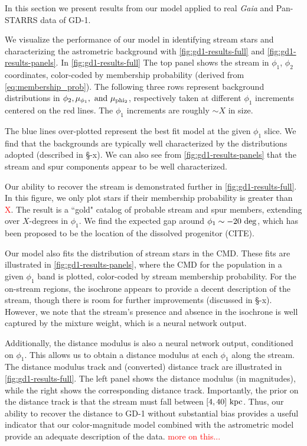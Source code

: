 \documentclass[twocolumn]{aastex631}
\newcommand{\TODO}[1]{{\textcolor{red}{#1}}}
\newcommand{\JN}[1]{\TODO{#1}}
\begin{document}
            In this section we present results from our model applied to real {\it Gaia} and Pan-STARRS data of GD-1. 

            We visualize the performance of our model in identifying stream stars and characterizing the astrometric background with \autoref{fig:gd1-results-full} and \autoref{fig:gd1-results-panels}. In \autoref{fig:gd1-results-full} The top panel shows the stream in $\phi_1$, $\phi_2$ coordinates, color-coded by membership probability (derived from \autoref{eq:membership_prob}). The following three rows represent background distributions in $\phi_2, \mu_{\phi_1}, \rm{\ and} \ \mu_{\rm phi_2}$, respectively taken at different $\phi_1$ increments centered on the red lines. The $\phi_1$ increments are roughly $\sim X$ in size. 

            The blue lines over-plotted represent the best fit model at the given $\phi_1$ slice. We find that the backgrounds are typically well characterized by the distributions adopted (described in \S-x). We can also see from \autoref{fig:gd1-results-panels}
            that the stream and spur components appear to be well characterized. 
            
            Our ability to recover the stream is demonstrated further in \autoref{fig:gd1-results-full}. In this figure, we only plot stars if their membership probability is greater than \JN{X}. The result is a ``gold" catalog of probable stream and spur members, extending over $X$-degrees in $\phi_1$. We find the expected gap around $\phi_1 \sim -20~\rm{deg}$, which has been proposed to be the location of the dissolved progenitor (CITE).

            Our model also fits the distribution of stream stars in the CMD. These fits are illustrated in \autoref{fig:gd1-results-panels}, where the CMD for the population in a given $\phi_1$ band is plotted, color-coded by stream membership probability. For the on-stream regions, the isochrone appears to provide a decent description of the stream, though there is room for further improvements (discussed in \S-x). However, we note that the stream's presence and absence in the isochrone is well captured by the mixture weight, which is a neural network output. 
            
            Additionally, the distance modulus is also a neural network output, conditioned on $\phi_1$. This allows us to obtain a distance modulus at each $\phi_1$ along the stream. The distance modulus track and (converted) distance track are illustrated in \autoref{fig:gd1-results-full}. The left panel shows the distance modulus (in magnitudes), while the right shows the corresponding distance track. Importantly, the prior on the distance track is that the stream must fall between $[4,40]~\rm{kpc}$. Thus, our ability to recover the distance to GD-1 without substantial bias provides a useful indicator that our color-magnitude model combined with the astrometric model provide an adequate description of the data. \JN{more on this...}
\end{document}
